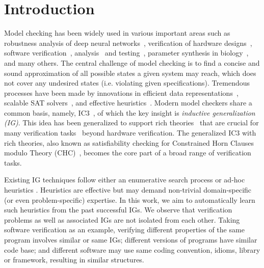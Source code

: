 
\section{Introduction}
\label{chap:intro}

Model checking has been widely used in various important areas such as robustness analysis of deep neural networks~\cite{Katz:cav19}, verification of hardware designs~\cite{SMC96}, software verification~\cite{Ball02}, analysis~\cite{ESC-java-02} and testing~\cite{Sheyner:SP02}, parameter synthesis in biology~\cite{Barnat:biology12}, and many others. 
The central challenge of model checking is to find a concise and sound approximation of all possible states a given system may reach, which does not cover any undesired states (i.e. violating given specifications). 
Tremendous processes have been made by innovations in efficient data representations~\cite{BDD}, scalable SAT solvers~\cite{CDCL,chaff,minisat}, and effective heuristics~\cite{CEGAR,BMC,McMillan:cav06}.  
Modern model checkers share a common basis, namely, IC3~\cite{IC3}, of which the key insight is \textit{inductive generalization (IG)}.
This idea has been generalized to support rich theories~\cite{GPDR} that are crucial for many verification tasks~\cite{Komuravelli:cav13,SeaHorn} beyond hardware verification. 
The generalized IC3 with rich theories, also known as satisfiability checking for Constrained Horn Clauses modulo Theory
(CHC)~\cite{DBLP:conf/birthday/BjornerGMR15}, becomes the core part of a broad range of verification tasks.



Existing IG techniques follow either an enumerative search process \cite{IC3,Bradley:fmcad11} or ad-hoc heuristics \cite{Griggio:CAD16,GSpacer}. 
Heuristics are effective but may demand non-trivial domain-specific (or even problem-specific) expertise. 
In this work, we aim to automatically learn such heuristics from the past successful IGs. 
We observe that verification problems as well as associated IGs are not isolated from each other. 
Taking software verification as an example, verifying different properties of the same program involves similar or same IGs; different versions of programs have similar code base; and
different software may use same coding convention, idioms, library or framework, resulting in similar structures.

